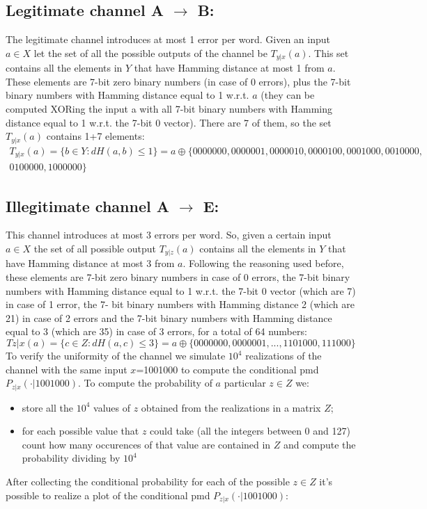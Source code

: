 \documentclass{report}
\begin{document}
\subsection*{Legitimate channel A $\boldsymbol{\to}$ B:}
The legitimate channel introduces at most 1 error per word. Given an input $a\in X$ let the set of all the possible outputs of the channel be $T_{y|x}(a)$. This set contains all the elements in $Y$ that have Hamming distance at most 1 from $a$. These elements are 7-bit zero binary numbers (in case of 0 errors), plus the 7-bit binary numbers with Hamming distance equal to 1 w.r.t. $a$ (they can be computed XORing the input a with all 7-bit binary numbers with Hamming distance equal to 1 w.r.t. the 7-bit 0 vector). There are 7 of them, so the set $T_{y|x}(a)$ contains 1+7 elements: 
\begin{equation*}
\begin{aligned}
T_{y|x}(a)= \{b\in Y : dH(a, b)\leq1\} = a\oplus \{0000000, 0000001, 0000010, 0000100, 0001000, 0010000,\\ 0100000, 1000000\}
\end{aligned}
\end{equation*}


\subsection*{Illegitimate channel A $\boldsymbol{\to}$ E:}
This channel introduces at most 3 errors per word. So, given a certain input $a\in X$ the set of all  possible output $T_{y|z}(a)$ contains all the elements in $Y$ that have Hamming distance at most 3  from $a$. Following the reasoning used before, these elements are 7-bit zero binary numbers in case of 0 errors, the 7-bit  binary numbers with Hamming distance equal to 1 w.r.t. the 7-bit 0 vector (which are 7) in case of 1 error, the 7- bit binary numbers with Hamming distance 2 (which are 21) in case of 2 errors and the 7-bit  binary numbers with Hamming distance equal to 3 (which are 35) in case of 3 errors, for a total of  64 numbers: 
\begin{equation*}
Tz|x(a) = \{c\in Z : dH(a, c)\leq3\} = a\oplus \{0000000, 0000001, ..., 1101000, 111000\}
\end{equation*}
To verify the uniformity of the channel we simulate $10^4$ realizations of the channel with the same  input $x$=1001000 to compute the conditional pmd $P_{z|x}(\cdot |1001000)$. To compute the probability of $a$ particular $z\in Z$ we: 
\begin{itemize}
\item store all the $10^4$ values of $z$ obtained from the realizations in a matrix $Z$;
\item for each possible value that $z$ could take (all the integers between 0 and 127) count how many  occurences of that value are contained in $Z$ and compute the probability dividing by $10^4$ 
\end{itemize}
After collecting the conditional probability for each of the possible $z\in Z$ it’s possible to realize a  plot of the conditional pmd $P_{z|x}(\cdot|1001000)$:
\end{document}
